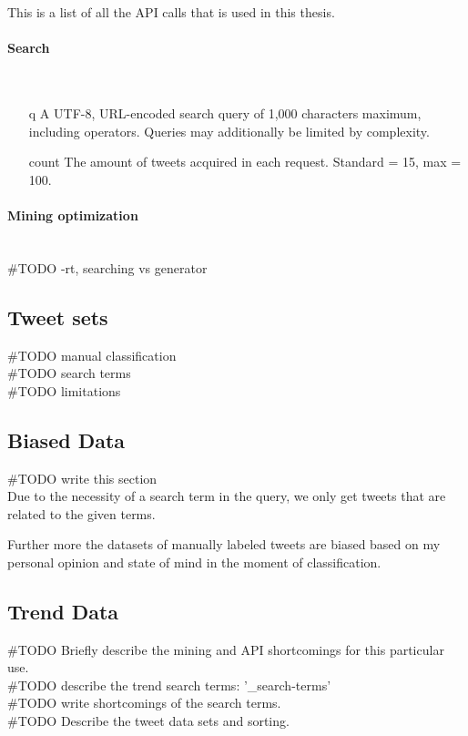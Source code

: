 This is a list of all the API calls that is used in this thesis.
% 

\paragraph{Search} 
\hspace{0pt}\\

\begin{itemize}
\item[q] A UTF-8, URL-encoded search query of 1,000 characters maximum, including
operators. Queries may additionally be limited by complexity.

\item[count] The amount of tweets acquired in each request. Standard = 15, max
= 100. 

\end{itemize}
%

\paragraph{Mining optimization}
\hspace{0pt}\\

#TODO -rt, searching vs generator\\ 
%

\subsection{Tweet sets}
#TODO manual classification\\
#TODO search terms\\
#TODO limitations\\

\subsection{Biased Data}
#TODO write this section\\
Due to the necessity of a search term in the query, we only get tweets that are
related to the given terms.

Further more the datasets of manually labeled tweets are biased based on my
personal opinion and state of mind in the moment of classification.  

\subsection{Trend Data}
#TODO Briefly describe the mining and API shortcomings for this particular
use.\\
#TODO describe the trend search terms: '\_search-terms'\\
#TODO write shortcomings of the search terms. \\
#TODO Describe the tweet data sets and sorting. \\ 


